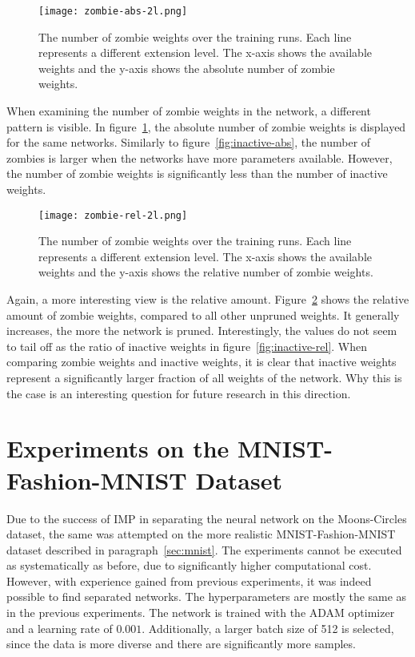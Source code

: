 \begin{figure}
    \centering
    \texttt{[image: zombie-abs-2l.png]}
    \caption[Zombie weights during training runs, absolute]{
    The number of zombie weights over the training runs. 
    Each line represents a different extension level. 
    The x-axis shows the available weights and the y-axis shows the absolute number of zombie weights.
    }\label{fig:zombie-abs}
\end{figure}

When examining the number of zombie weights in the network, a different pattern is visible.
In figure~\ref{fig:zombie-abs}, the absolute number of zombie weights is displayed for the same networks.
Similarly to figure~\ref{fig:inactive-abs}, the number of zombies is larger when the networks have more parameters available.
However, the number of zombie weights is significantly less than the number of inactive weights.

\begin{figure}
    \centering
    \texttt{[image: zombie-rel-2l.png]}
    \caption[Zombie weights during training runs, relative]{
        The number of zombie weights over the training runs. 
        Each line represents a different extension level. 
        The x-axis shows the available weights and the y-axis shows the relative number of zombie weights.
    }\label{fig:zombie-rel}
\end{figure}

Again, a more interesting view is the relative amount.
Figure~\ref{fig:zombie-rel} shows the relative amount of zombie weights, compared to all other unpruned weights.
It generally increases, the more the network is pruned.
Interestingly, the values do not seem to tail off as the ratio of inactive weights in figure~\ref{fig:inactive-rel}.
When comparing zombie weights and inactive weights, it is clear that inactive weights represent a significantly larger fraction of all weights of the network.
Why this is the case is an interesting question for future research in this direction.

\section{Experiments on the MNIST-Fashion-MNIST Dataset}
Due to the success of IMP in separating the neural network on the Moons-Circles dataset, the same was attempted on the more realistic MNIST-Fashion-MNIST dataset described in paragraph~\ref{sec:mnist}.
The experiments cannot be executed as systematically as before, due to significantly higher computational cost.
However, with experience gained from previous experiments, it was indeed possible to find separated networks.
The hyperparameters are mostly the same as in the previous experiments.
The network is trained with the ADAM optimizer and a learning rate of $0.001$.
Additionally, a larger batch size of 512 is selected, since the data is more diverse and there are significantly more samples.

